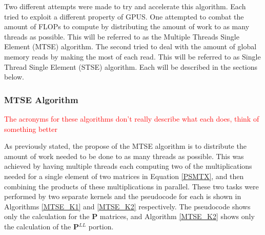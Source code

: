 \documentclass[12pt]{report}
\newcommand{\notetodylan}[1]{\textcolor{red}{#1}} %
\begin{document}
Two different attempts were made to try and accelerate this algorithm. Each tried to exploit a different property of GPUS. One attempted to combat the amount of FLOPs to compute by distributing the amount of work to as many threads as possible. This will be referred to as the Multiple Threads Single Element (MTSE) algorithm. The second tried to deal with the amount of global memory reads by making the most of each read. This will be referred to as Single Thread Single Element (STSE) algorithm. Each will be described in the sections below.

\subsubsection{MTSE Algorithm}
\notetodylan{The acronyms for these algorithms don't really describe what each does, think of something better}

As previously stated, the propose of the MTSE algorithm is to distribute the amount of work needed to be done to as many threads as possible. This was achieved by having multiple threads each computing two of the multiplications needed for a single element of two matrices in Equation \ref{PSMTX}, and then combining the products of these multiplications in parallel. These two tasks were performed by two separate kernels and the pseudocode for each is shown in Algorithms \ref{MTSE_K1} and \ref{MTSE_K2} respectively. The pseudocode shows only the calculation for the \textbf{P} matrices, and Algorithm \ref{MTSE_K2} shows only the calculation of the \textbf{P$^{LL}$} portion. 
\end{document}
